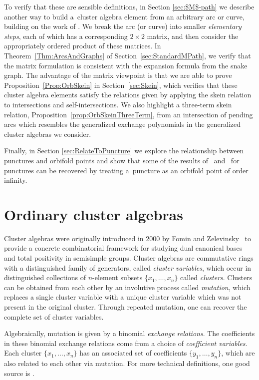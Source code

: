 \documentclass[pdftex]{sigma}%
\numberwithin{equation}{section}
\begin{document}
 To verify that these are sensible definitions, in Section \ref{sec:$M$-path} we describe another way to build a~cluster algebra element from an arbitrary arc or curve, building on the work of \cite{MW}. We break the arc (or curve) into smaller \emph{elementary steps}, each of which has a corresponding $2 \times 2$ matrix, and then consider the appropriately ordered product of these matrices. In Theorem~\ref{Thm:ArcsAndGraphs} of Section~\ref{sec:StandardMPath}, we verify that the matrix formulation is consistent with the expansion formula from the snake graph. The advantage of the matrix viewpoint is that we are able to prove Proposition~\ref{Prop:OrbSkein} in Section~\ref{sec:Skein}, which verifies that these cluster algebra elements satisfy the relations given by applying the skein relation to intersections and self-intersections. We also highlight a three-term skein relation, Proposition~\ref{prop:OrbSkeinThreeTerm}, from an intersection of pending arcs which resembles the generalized exchange polynomials in the generalized cluster algebras we consider.

Finally, in Section \ref{sec:RelateToPuncture} we explore the relationship between punctures and orbifold points and show that some of the results of~\cite{MSW} and~\cite{MW} for punctures can be recovered by treating a~puncture as an orbifold point of order infinity.

\section{Ordinary cluster algebras}\label{sec:ordinaryClusterAlgebras}

Cluster algebras were originally introduced in 2000 by Fomin and Zelevinsky~\cite{Fomin-Zelevinsky-I} to provide a concrete combinatorial framework for studying dual canonical bases and total positivity in semisimple groups. Cluster algebras are commutative rings with a distinguished family of ge\-nerators, called \emph{cluster variables}, which occur in distinguished collections of $n$-element subsets $\{x_1, \dots, x_n \}$ called \emph{clusters}. Clusters can be obtained from each other by an involutive process called \emph{mutation}, which replaces a single cluster variable with a unique cluster variable which was not present in the original cluster. Through repeated mutation, one can recover the complete set of cluster variables.

Algebraically, mutation is given by a binomial \emph{exchange relations}. The coefficients in these binomial exchange relations come from a choice of \emph{coefficient variables}. Each cluster $\{ x_1, \dots, x_n \}$ has an associated set of coefficients $\{y_1, \dots, y_n \}$, which are also related to each other via mutation. For more technical definitions, one good source is \cite[Section~2]{Fomin-Zelevinsky-IV}.
\end{document}
